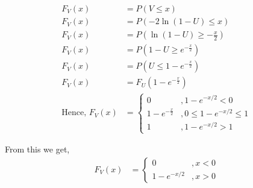 \documentclass[journal,12pt,twocolumn]{article}
\renewcommand\thesection{\arabic{section}}
\begin{document}
\begin{enumerate}[label=\thesection.\arabic*
,ref=\thesection.\theenumi]
\begin{align}
	F_V(x) &= P(V \leq x) \\
	F_V(x) &= P(-2 \ln(1-U) \leq x) \\
	F_V(x) &= P(\ln(1-U) \geq -\frac{x}{2}) \\
	F_V(x) &= P(1-U \geq e^{-\frac{x}{2}}) \\
	F_V(x) &= P(U \leq 1-e^{-\frac{x}{2}}) \\
	F_V(x) &= F_U(1-e^{-\frac{x}{2}}) \\
	\text{Hence, } F_V(x) &= \begin{cases} 0 &, 1-e^{-x/2} < 0 \\
	1-e^{-\frac{x}{2}} &, 0 \leq 1-e^{-x/2} \leq 1 \\
	1 &, 1-e^{-x/2} > 1 \end{cases}
\end{align}

From this we get,
\begin{align}
	F_V(x) &= \begin{cases} 0 &, x < 0 \\
	1 - e^{-x/2} &, x>0\end{cases}
\end{align}
%
\end{enumerate}
\end{document}
